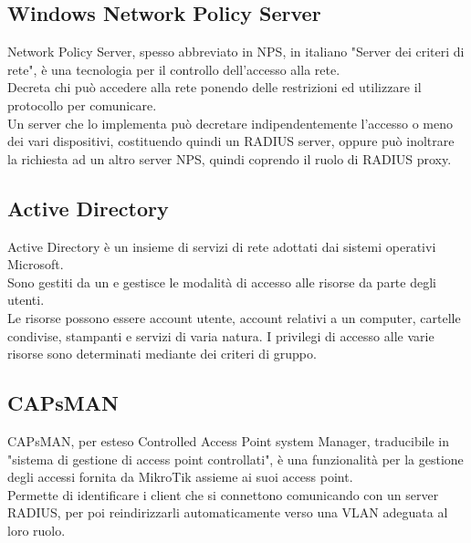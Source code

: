 \documentclass[Tesi.tex]{subfiles}
\begin{document}
\subsection{Windows Network Policy Server}
Network Policy Server, spesso abbreviato in NPS, in italiano "Server dei criteri di rete", è una tecnologia per il controllo dell'accesso alla rete. \\
Decreta chi può accedere alla rete ponendo delle restrizioni ed utilizzare il protocollo  per comunicare. \\
Un server che lo implementa può decretare indipendentemente l'accesso o meno dei vari dispositivi, costituendo quindi un RADIUS server, oppure può inoltrare la richiesta ad un altro server NPS, quindi coprendo il ruolo di RADIUS proxy.

\subsection{Active Directory}
Active Directory è un insieme di servizi di rete adottati dai sistemi operativi Microsoft. \\
Sono gestiti da un  e gestisce le modalità di accesso alle risorse da parte degli utenti. \\
Le risorse possono essere account utente, account relativi a un computer, cartelle condivise, stampanti e servizi di varia natura. I privilegi di accesso alle varie risorse sono determinati mediante dei criteri di gruppo.

\subsection{CAPsMAN}
CAPsMAN, per esteso Controlled Access Point system Manager, traducibile in "sistema di gestione di access point controllati", è una funzionalità per la gestione degli accessi fornita da MikroTik assieme ai suoi access point. \\
Permette di identificare i client che si connettono comunicando con un server RADIUS, per poi reindirizzarli automaticamente verso una VLAN adeguata al loro ruolo.

\end{document}
